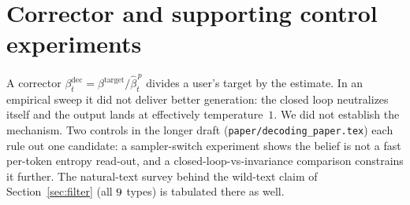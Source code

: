 \documentclass[11pt]{article}
\begin{document}
\section{Corrector and supporting control experiments}\label{app:controls}
A corrector $\beta^{\mathrm{dec}}_t = \beta^{\mathrm{target}}/\hat\beta_t^{\,p}$
divides a user's target by the estimate. In an empirical sweep it did not
deliver better generation: the closed loop neutralizes itself and the output
lands at effectively temperature~$1$. We did not establish the mechanism. Two
controls in the longer draft (\texttt{paper/decoding\_paper.tex}) each rule out
one candidate: a sampler-switch experiment shows the belief is not a fast
per-token entropy read-out, and a closed-loop-vs-invariance comparison
constrains it further. The natural-text survey behind the wild-text claim of
Section~\ref{sec:filter} (all $9$ types) is tabulated there as
well.



\end{document}
